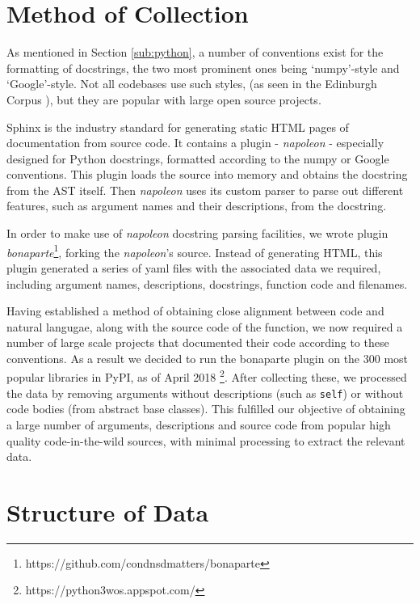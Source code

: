 \section{Method of Collection} %
\label{sec:method_of_collection}

As mentioned in Section \ref{sub:python}, a number of conventions exist for the formatting of docstrings, the two most prominent ones being `numpy'-style and `Google'-style.
Not all codebases use such styles, (as seen in the Edinburgh Corpus \cite{barone_parallel_2017}), but they are popular with large open source projects. 

Sphinx is the industry standard for generating static HTML pages of documentation from source code. It contains a plugin - \textit{napoleon} - especially designed for Python docstrings, formatted according to the numpy or Google conventions. 
This plugin loads the source into memory and obtains the docstring from the AST itself.
Then \textit{napoleon} uses its custom parser to parse out different features, such as argument names and their descriptions, from the docstring.

In order to make use of \textit{napoleon} docstring parsing facilities, we wrote plugin \textit{bonaparte}\footnote{https://github.com/condnsdmatters/bonaparte}, forking the \textit{napoleon}'s source. 
Instead of generating HTML, this plugin generated a series of yaml files with the associated data we required, including argument names, descriptions, docstrings, function code and filenames.
 
Having established a method of obtaining close alignment between code and natural langugae, along with the source code of the function, we now required a number of large scale projects that documented their code according to these conventions. 
As a result we decided to run the bonaparte plugin on the 300 most popular libraries in PyPI, as of April 2018 \footnote{https://python3wos.appspot.com/}.
After collecting these, we processed the data by removing arguments without descriptions (such as \texttt{self}) or without code bodies (from abstract base classes).
This fulfilled our objective of obtaining a large number of arguments, descriptions and source code from popular high quality code-in-the-wild sources, with minimal processing to extract the relevant data.

\section{Structure of Data}

